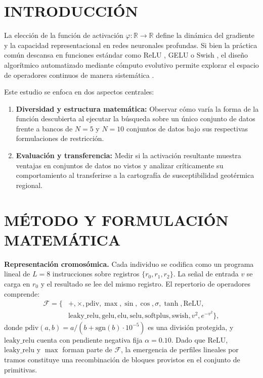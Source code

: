 \documentclass[10pt,twocolumn,letterpaper]{article}
\newcommand{\R}{\mathbb{R}}
\begin{document}
\section{INTRODUCCIÓN}

La elección de la función de activación $\varphi:\R\to\R$ define la dinámica del gradiente y la capacidad representacional en redes neuronales profundas. Si bien la práctica común descansa en funciones estándar como ReLU \citep{nair2010}, GELU \citep{hendrycks2016} o Swish \citep{ramachandran2018}, el diseño algorítmico automatizado mediante cómputo evolutivo permite explorar el espacio de operadores continuos de manera sistemática \citep{real2020automl,bingham2020}.

Este estudio se enfoca en dos aspectos centrales:
\begin{enumerate}[leftmargin=1.2em]
  \item \textbf{Diversidad y estructura matemática:} Observar cómo varía la forma de la función descubierta al ejecutar la búsqueda sobre un único conjunto de datos frente a bancos de $N=5$ y $N=10$ conjuntos de datos bajo sus respectivas formulaciones de restricción.
  \item \textbf{Evaluación y transferencia:} Medir si la activación resultante muestra ventajas en conjuntos de datos no vistos y analizar críticamente su comportamiento al transferirse a la cartografía de susceptibilidad geotérmica regional.
\end{enumerate}

\section{MÉTODO Y FORMULACIÓN MATEMÁTICA}

\textbf{Representación cromosómica.} Cada individuo se codifica como un programa lineal de $L=8$ instrucciones sobre registros $\{r_0, r_1, r_2\}$. La señal de entrada $v$ se carga en $r_0$ y el resultado se lee del mismo registro. El repertorio de operadores comprende:
\begin{align}
  \mathcal{F} = \{&+, \times, \mathrm{pdiv}, \max, \sin, \cos, \sigma, \tanh, \mathrm{ReLU}, \nonumber \\
  &\mathrm{leaky\_relu}, \mathrm{gelu}, \mathrm{elu}, \mathrm{selu}, \mathrm{softplus}, \mathrm{swish}, v^2, e^{-v^2}\},
\end{align}
donde $\mathrm{pdiv}(a, b) = a / (b + \mathrm{sgn}(b)\cdot 10^{-5})$ es una división protegida, y $\mathrm{leaky\_relu}$ cuenta con pendiente negativa fija $\alpha = 0.10$. Dado que $\mathrm{ReLU}$, $\mathrm{leaky\_relu}$ y $\max$ forman parte de $\mathcal{F}$, la emergencia de perfiles lineales por tramos constituye una recombinación de bloques provistos en el conjunto de primitivas.
\end{document}
